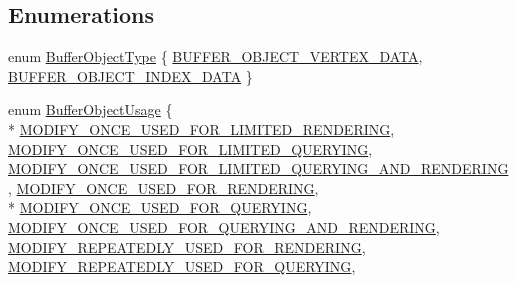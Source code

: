 \subsection*{Enumerations}
\begin{DoxyCompactItemize}
\item 
enum \hyperlink{namespacekglt_aacaa83f89296ac24671ad3db1d5cb2ee}{Buffer\-Object\-Type} \{ \hyperlink{namespacekglt_aacaa83f89296ac24671ad3db1d5cb2eea7715763cb3be62cd05cd5105e1f7f8b0}{B\-U\-F\-F\-E\-R\-\_\-\-O\-B\-J\-E\-C\-T\-\_\-\-V\-E\-R\-T\-E\-X\-\_\-\-D\-A\-T\-A}, 
\hyperlink{namespacekglt_aacaa83f89296ac24671ad3db1d5cb2eea18bdba5cf467f6b14d586f4911f6914b}{B\-U\-F\-F\-E\-R\-\_\-\-O\-B\-J\-E\-C\-T\-\_\-\-I\-N\-D\-E\-X\-\_\-\-D\-A\-T\-A}
 \}
\item 
enum \hyperlink{namespacekglt_a964a917aefb575ce817a16ccb32579f3}{Buffer\-Object\-Usage} \{ \\*
\hyperlink{namespacekglt_a964a917aefb575ce817a16ccb32579f3a91a5ee04d0b9a276e749eb18150e3538}{M\-O\-D\-I\-F\-Y\-\_\-\-O\-N\-C\-E\-\_\-\-U\-S\-E\-D\-\_\-\-F\-O\-R\-\_\-\-L\-I\-M\-I\-T\-E\-D\-\_\-\-R\-E\-N\-D\-E\-R\-I\-N\-G}, 
\hyperlink{namespacekglt_a964a917aefb575ce817a16ccb32579f3a9abc398b8a8ba4a12d8348c65787d440}{M\-O\-D\-I\-F\-Y\-\_\-\-O\-N\-C\-E\-\_\-\-U\-S\-E\-D\-\_\-\-F\-O\-R\-\_\-\-L\-I\-M\-I\-T\-E\-D\-\_\-\-Q\-U\-E\-R\-Y\-I\-N\-G}, 
\hyperlink{namespacekglt_a964a917aefb575ce817a16ccb32579f3a70acbe04e4611969366ee83421a17fab}{M\-O\-D\-I\-F\-Y\-\_\-\-O\-N\-C\-E\-\_\-\-U\-S\-E\-D\-\_\-\-F\-O\-R\-\_\-\-L\-I\-M\-I\-T\-E\-D\-\_\-\-Q\-U\-E\-R\-Y\-I\-N\-G\-\_\-\-A\-N\-D\-\_\-\-R\-E\-N\-D\-E\-R\-I\-N\-G}, 
\hyperlink{namespacekglt_a964a917aefb575ce817a16ccb32579f3a1fa8b4c7d6f629b6dd3ecb42f3fe844d}{M\-O\-D\-I\-F\-Y\-\_\-\-O\-N\-C\-E\-\_\-\-U\-S\-E\-D\-\_\-\-F\-O\-R\-\_\-\-R\-E\-N\-D\-E\-R\-I\-N\-G}, 
\\*
\hyperlink{namespacekglt_a964a917aefb575ce817a16ccb32579f3ae721aecc257c9b584053da3a1094d6bf}{M\-O\-D\-I\-F\-Y\-\_\-\-O\-N\-C\-E\-\_\-\-U\-S\-E\-D\-\_\-\-F\-O\-R\-\_\-\-Q\-U\-E\-R\-Y\-I\-N\-G}, 
\hyperlink{namespacekglt_a964a917aefb575ce817a16ccb32579f3ac284d317adb88bf2baeaa812e9eeacc8}{M\-O\-D\-I\-F\-Y\-\_\-\-O\-N\-C\-E\-\_\-\-U\-S\-E\-D\-\_\-\-F\-O\-R\-\_\-\-Q\-U\-E\-R\-Y\-I\-N\-G\-\_\-\-A\-N\-D\-\_\-\-R\-E\-N\-D\-E\-R\-I\-N\-G}, 
\hyperlink{namespacekglt_a964a917aefb575ce817a16ccb32579f3a630624905f448e2bf6dbea4342dc2c02}{M\-O\-D\-I\-F\-Y\-\_\-\-R\-E\-P\-E\-A\-T\-E\-D\-L\-Y\-\_\-\-U\-S\-E\-D\-\_\-\-F\-O\-R\-\_\-\-R\-E\-N\-D\-E\-R\-I\-N\-G}, 
\hyperlink{namespacekglt_a964a917aefb575ce817a16ccb32579f3afcdad12b6cffb57945382f3c1a8f2c6a}{M\-O\-D\-I\-F\-Y\-\_\-\-R\-E\-P\-E\-A\-T\-E\-D\-L\-Y\-\_\-\-U\-S\-E\-D\-\_\-\-F\-O\-R\-\_\-\-Q\-U\-E\-R\-Y\-I\-N\-G}, 

\end{DoxyCompactItemize}

